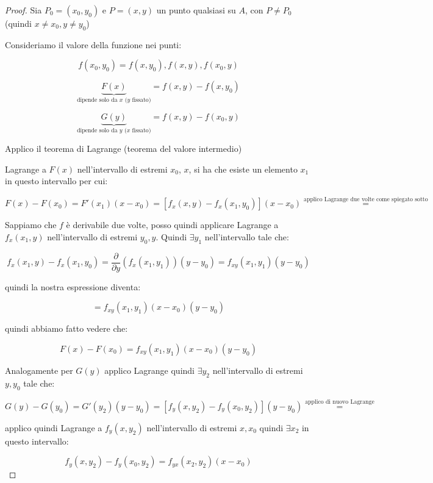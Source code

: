 \documentclass[../appunti-analisi.tex]{subfiles}
\begin{document}
\begin{proof}
       Sia $P_0=(x_0,y_0)$ e $P=(x,y)$ un punto qualsiasi su $A$, con $P \neq P_0$ (quindi $x \neq x_0, y \neq y_0$)

       Consideriamo il valore della funzione nei punti:

       \[
           f(x_0,y_0) = f(x,y_0), f(x,y), f(x_0,y)
       \]

       \[
           \underbrace{F(x)}_\text{dipende solo da $x$ ($y$ fissato)} = f(x,y) - f(x,y_0)
       \]

       \[
           \underbrace{G(y)}_\text{dipende solo da $y$ ($x$ fissato)}  = f(x,y) - f(x_0,y)
       \]

       Applico il teorema di Lagrange (teorema del valore intermedio)

       Lagrange a $F(x)$ nell'intervallo di estremi $x_0$, $x$, si ha che esiste un elemento $x_1$ in questo intervallo per cui:

       \[
           F(x)- F(x_0) = F'(x_1) (x-x_0) = [f_x(x,y) - f_x(x_1,y_0) ] (x- x_0)  \overset{\text{applico Lagrange due volte come spiegato sotto}}{=}
       \]

       Sappiamo che $f$ è derivabile due volte, posso quindi applicare Lagrange a $f_x(x_1,y)$ nell'intervallo di estremi $y_0,y$. Quindi $\exists y_1$ nell'intervallo tale che:

       \[
           f_x(x_1,y) - f_x(x_1,y_0) = \frac{\partial }{\partial y}(f_x(x_1,y_1))(y-y_0) = f_{xy}(x_1,y_1)(y-y_0)
       \]

       quindi la nostra espressione diventa:

       \[
           = f_{xy}(x_1,y_1)(x-x_0) (y-y_0)
       \]

       quindi abbiamo fatto vedere che:

       \[
           F(x) -F(x_0) = f_{xy}(x_1,y_1) (x-x_0)(y-y_0)
       \]

       Analogamente per $G(y)$ applico Lagrange quindi $\exists y_2$ nell'intervallo di estremi $y,y_0$ tale che:

       \[
           G(y) -G(y_0) = G'(y_2) (y-y_0) = [f_y(x,y_2) - f_y(x_0,y_2)] (y-y_0) \overset{\text{applico di nuovo Lagrange}}{=}
       \]

       applico quindi Lagrange a $f_y(x,y_2)$ nell'intervallo di estremi $x,x_0$ quindi $\exists x_2$ in questo intervallo:

       \[
           f_y(x,y_2) - f_y(x_0,y_2) = f_{yx}(x_2,y_2)(x-x_0)
       \]


\end{proof}
\end{document}
